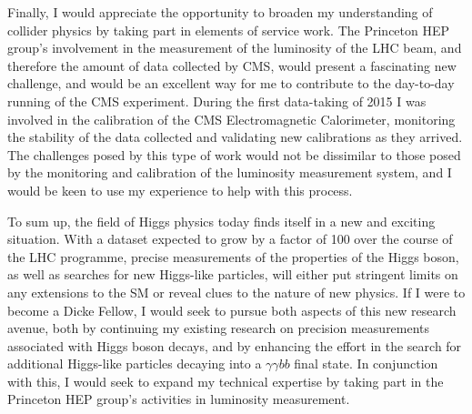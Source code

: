 \documentclass[11pt,a4paper,sans]{moderncv}        %
\begin{document}
Finally, I would appreciate the opportunity to broaden my understanding of collider physics by taking part in elements of service work. The Princeton HEP group's involvement in the measurement of the luminosity of the LHC beam, and therefore the amount of data collected by CMS, would present a fascinating new challenge, and would be an excellent way for me to contribute to the day-to-day running of the CMS experiment. During the first data-taking of 2015 I was involved in the calibration of the CMS Electromagnetic Calorimeter, monitoring the stability of the data collected and validating new calibrations as they arrived. The challenges posed by this type of work would not be dissimilar to those posed by the monitoring and calibration of the luminosity measurement system, and I would be keen to use my experience to help with this process.  %

To sum up, the field of Higgs physics today finds itself in a new and exciting situation. With a dataset expected to grow by a factor of 100 over the course of the LHC programme, precise measurements of the properties of the Higgs boson, as well as searches for new Higgs-like particles, will either put stringent limits on any extensions to the SM or reveal clues to the nature of new physics. If I were to become a Dicke Fellow, I would seek to pursue both aspects of this new research avenue, both by continuing my existing research on precision measurements associated with Higgs boson decays, and by enhancing the effort in the search for additional Higgs-like particles decaying into a $\gamma\gamma bb$ final state. In conjunction with this, I would seek to expand my technical expertise by taking part in the Princeton HEP group's activities in luminosity measurement. 

\makeletterclosing

\vspace{0.42cm}
\renewcommand{\bibliographyitemlabel}{\@biblabel{\arabic{enumiv}}}%
\renewcommand{\refname}{References}

\end{document}
